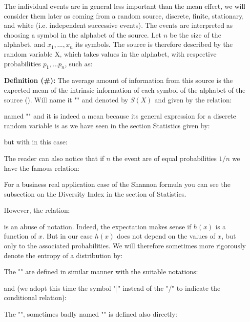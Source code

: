 	The individual events are in general less important than the mean effect, we will consider them later as coming from a random source, discrete, finite, stationary, and white (i.e. independent successive events). The events are interpreted as choosing a symbol in the alphabet of the source. Let $n$ be the size of the alphabet, and $x_1,...,x_n$ its symbols. The source is therefore described by the random variable X, which takes values in the alphabet, with respective probabilities $p_1,...p_n$, such as:
	
	\textbf{Definition (\#\mydef):}
	The average amount of information from this source is the expected mean of the intrinsic information of each symbol of the alphabet of the source (). Will name it "" and denoted by $S(X)$ and given by the relation:
	
	named "" and it is indeed a mean because its general expression for a discrete random variable is as we have seen in the section Statistics given by:
	
	but with in this case:
	
	The reader can also notice that if $n$ the event are of equal probabilities $1/n$ we have the famous relation:
	
	\begin{tcolorbox}[title=Remark,colframe=black,arc=10pt]
	For a business real application case of the Shannon formula you can see the subsection on the Diversity Index in the section of Statistics.
	\end{tcolorbox}
	However, the relation:
	
	is an abuse of notation. Indeed, the expectation makes sense if $h (x)$ is a function of $x$. But in our case $h (x)$ does not depend on the values of $x$, but only to the associated probabilities. We will therefore sometimes more rigorously denote the entropy of a distribution by:
	
	The "" are defined in similar manner with the suitable notations:
	
	and (we adopt this time the symbol "|" instead of the "/" to indicate the conditional relation):
	
	The "", sometimes badly named "" is defined also directly:
	
